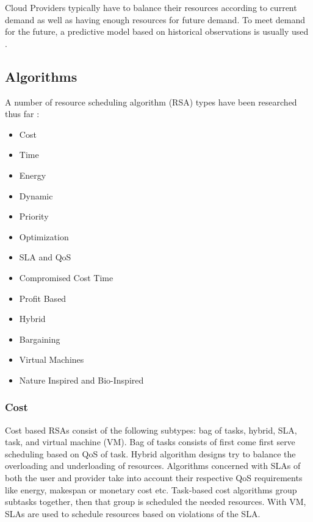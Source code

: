 \documentclass[fullapage,12pt]{article}
\begin{document}

Cloud Providers typically have to balance their resources according to current demand as well as having enough resources for future demand. To meet demand for the future, a predictive model based on historical observations is usually used \cite{Jennings2015}.

\subsection{Algorithms} \label{sub:schedalgorithms}

A number of resource scheduling algorithm (RSA) types have been researched thus far \cite{Singh2016}:
\begin{itemize}
    \item Cost
    \item Time
    \item Energy
    \item Dynamic
    \item Priority
    \item Optimization
    \item SLA and QoS
    \item Compromised Cost Time
    \item Profit Based
    \item Hybrid
    \item Bargaining
    \item Virtual Machines
    \item Nature Inspired and Bio-Inspired
\end{itemize}



\subsubsection{Cost} \label{ssub:algCost}

Cost based RSAs consist of the following subtypes: bag of tasks, hybrid, SLA, task, and virtual machine (VM).
Bag of tasks consists of first come first serve scheduling based on QoS of task.
Hybrid algorithm designs try to balance the overloading and underloading of resources.
Algorithms concerned with SLAs of both the user and provider take into account their respective QoS requirements like energy, makespan or monetary cost etc.
Task-based cost algorithms group subtasks together, then that group is scheduled the needed resources.
With VM, SLAs are used to schedule resources based on violations of the SLA.
\end{document}
